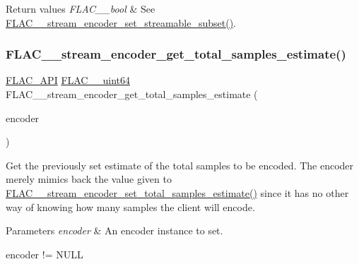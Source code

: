\begin{DoxyRetVals}{Return values}
{\em F\+L\+A\+C\+\_\+\+\_\+bool} & See \hyperlink{group__flac__stream__encoder_ga163f1acfe8b6b8ae849f0f4f7c0708f4}{F\+L\+A\+C\+\_\+\+\_\+stream\+\_\+encoder\+\_\+set\+\_\+streamable\+\_\+subset()}. \\
\hline
\end{DoxyRetVals}
\mbox{\label{group__flac__stream__encoder_ga8b206187a5b2a261ad4b5067fa43525b}} 
\subsubsection{\texorpdfstring{F\+L\+A\+C\+\_\+\+\_\+stream\+\_\+encoder\+\_\+get\+\_\+total\+\_\+samples\+\_\+estimate()}{FLAC\_\_stream\_encoder\_get\_total\_samples\_estimate()}}
{\footnotesize\ttfamily \hyperlink{group__flac__export_ga56ca07df8a23310707732b1c0007d6f5}{F\+L\+A\+C\+\_\+\+A\+PI} \hyperlink{ordinals_8h_aa78c8c70a3eb8a58af7436f278acde8e}{F\+L\+A\+C\+\_\+\+\_\+uint64} F\+L\+A\+C\+\_\+\+\_\+stream\+\_\+encoder\+\_\+get\+\_\+total\+\_\+samples\+\_\+estimate (\begin{DoxyParamCaption}\item[{\hyperlink{zconf_8h_a2c212835823e3c54a8ab6d95c652660e}{const} \hyperlink{struct_f_l_a_c_____stream_encoder}{F\+L\+A\+C\+\_\+\+\_\+\+Stream\+Encoder} $\ast$}]{encoder }\end{DoxyParamCaption})}

Get the previously set estimate of the total samples to be encoded. The encoder merely mimics back the value given to \hyperlink{group__flac__stream__encoder_ga0d3f45052f2f7379c73e2b027c7f956c}{F\+L\+A\+C\+\_\+\+\_\+stream\+\_\+encoder\+\_\+set\+\_\+total\+\_\+samples\+\_\+estimate()} since it has no other way of knowing how many samples the client will encode.


\begin{DoxyParams}{Parameters}
{\em encoder} & An encoder instance to set.  
\begin{DoxyCode}
encoder != NULL 
\end{DoxyCode}
 \\
\hline
\end{DoxyParams}

